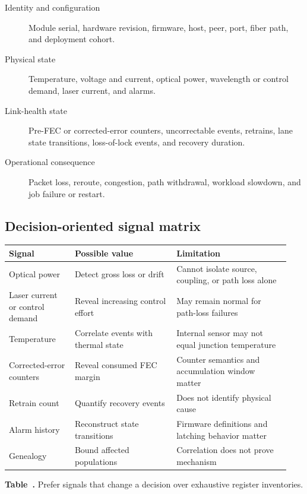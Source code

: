 \begin{description}
\item[Identity and configuration]
      Module serial, hardware revision, firmware, host, peer, port, fiber path,
      and deployment cohort.
\item[Physical state]
      Temperature, voltage and current, optical power, wavelength or control
      demand, laser current, and alarms.
\item[Link-health state]
      Pre-FEC or corrected-error counters, uncorrectable events, retrains, lane
      state transitions, loss-of-lock events, and recovery duration.
\item[Operational consequence]
      Packet loss, reroute, congestion, path withdrawal, workload slowdown, and
      job failure or restart.
\end{description}

\subsection{Decision-oriented signal matrix}

\begin{table}[ht]
\label{tab:ops-telemetry-matrix}%
\centering
\setlength{\tabcolsep}{3pt}%
\footnotesize
\renewcommand{\arraystretch}{1.15}%
\begin{tabular}{@{}p{0.22\linewidth}p{0.34\linewidth}p{0.38\linewidth}@{}}
\toprule
Signal & Possible value & Limitation \\
\midrule
Optical power &
Detect gross loss or drift &
Cannot isolate source, coupling, or path loss alone \\
\addlinespace[0.35em]
Laser current or control demand &
Reveal increasing control effort &
May remain normal for path-loss failures \\
\addlinespace[0.35em]
Temperature &
Correlate events with thermal state &
Internal sensor may not equal junction temperature \\
\addlinespace[0.35em]
Corrected-error counters &
Reveal consumed FEC margin &
Counter semantics and accumulation window matter \\
\addlinespace[0.35em]
Retrain count &
Quantify recovery events &
Does not identify physical cause \\
\addlinespace[0.35em]
Alarm history &
Reconstruct state transitions &
Firmware definitions and latching behavior matter \\
\addlinespace[0.35em]
Genealogy &
Bound affected populations &
Correlation does not prove mechanism \\
\bottomrule
\end{tabular}
\par\medskip
{\raggedright\footnotesize\textbf{Table~\thetable.} Prefer signals that change
a decision over exhaustive register inventories.\par}
\end{table}
\FloatBarrier

